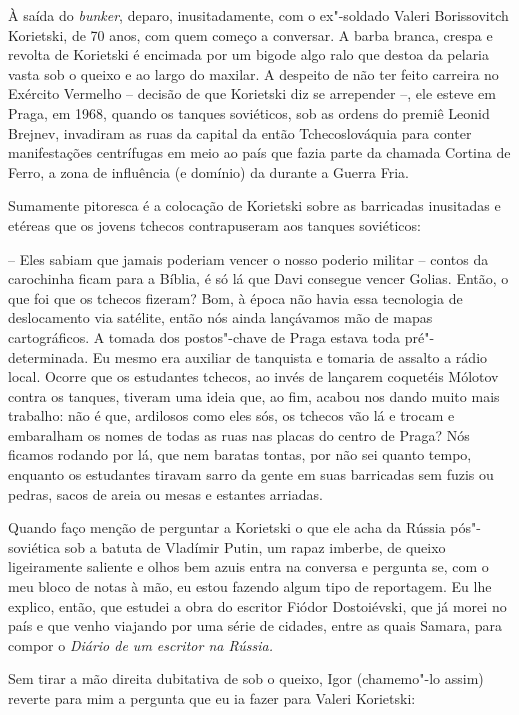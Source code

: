 À saída do \emph{bunker}, deparo, inusitadamente, com o ex"-soldado
Valeri Borissovitch Korietski, de 70 anos, com quem começo a conversar.
A barba branca, crespa e revolta de Korietski é encimada por um bigode
algo ralo que destoa da pelaria vasta sob o queixo e ao largo do
maxilar. A despeito de não ter feito carreira no Exército Vermelho --
decisão de que Korietski diz se arrepender --, ele esteve em Praga, em
1968, quando os tanques soviéticos, sob as ordens do premiê Leonid
Brejnev, invadiram as ruas da capital da então Tchecoslováquia para
conter manifestações centrífugas em meio ao país que fazia parte da
chamada Cortina de Ferro, a zona de influência (e domínio) da 
durante a Guerra Fria.

Sumamente pitoresca é a colocação de Korietski sobre as barricadas
inusitadas e etéreas que os jovens tchecos contrapuseram aos tanques
soviéticos:

-- Eles sabiam que jamais poderiam vencer o nosso poderio militar --
contos da carochinha ficam para a Bíblia, é só lá que Davi consegue
vencer Golias. Então, o que foi que os tchecos fizeram? Bom, à época não
havia essa tecnologia de deslocamento via satélite, então nós ainda
lançávamos mão de mapas cartográficos. A tomada dos postos"-chave de
Praga estava toda pré"-determinada. Eu mesmo era auxiliar de tanquista e
tomaria de assalto a rádio local. Ocorre que os estudantes tchecos, ao
invés de lançarem coquetéis Mólotov contra os tanques, tiveram uma ideia
que, ao fim, acabou nos dando muito mais trabalho: não é que, ardilosos
como eles sós, os tchecos vão lá e trocam e embaralham os nomes de todas
as ruas nas placas do centro de Praga? Nós ficamos rodando por lá, que
nem baratas tontas, por não sei quanto tempo, enquanto os estudantes
tiravam sarro da gente em suas barricadas sem fuzis ou pedras, sacos de
areia ou mesas e estantes arriadas.

Quando faço menção de perguntar a Korietski o que ele acha da Rússia
pós"-soviética sob a batuta de Vladímir Putin, um rapaz imberbe, de
queixo ligeiramente saliente e olhos bem azuis entra na conversa e
pergunta se, com o meu bloco de notas à mão, eu estou fazendo algum tipo
de reportagem. Eu lhe explico, então, que estudei a obra do escritor
Fiódor Dostoiévski, que já morei no país e que venho viajando por uma
série de cidades, entre as quais Samara, para compor o \emph{Diário de
um escritor na Rússia. }

Sem tirar a mão direita dubitativa de sob o queixo, Igor (chamemo"-lo
assim) reverte para mim a pergunta que eu ia fazer para Valeri
Korietski:

